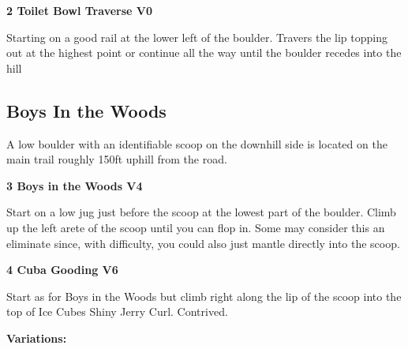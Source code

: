 \begin{multicols}{2}
			
			
			\needspace{1.5cm}
\label{rt:Toilet Bowl Traverse}
\colorbox{green!20}{
\parbox{0.95\linewidth}{
\textbf{
2 Toilet Bowl Traverse V0  
}}}

			\begin{adjustwidth}{0.5cm}{}			
			Starting on a good rail at the lower left of the boulder. Travers the lip topping out at the highest point or continue all the way until the boulder recedes into the hill
			\end{adjustwidth}
			
			
		


		\needspace{1.5cm}
		\subsection*{Boys In the Woods}\label{bf:Boys In the Woods}
		A low boulder with an identifiable scoop on the downhill side is located on the main trail roughly 150ft uphill from the road.\\
	
		
			
			\needspace{1.5cm}
\label{rt:Boys in the Woods}
\colorbox{RoyalBlue!20}{
\parbox{0.95\linewidth}{
\textbf{
3 Boys in the Woods V4  
}}}

			\begin{adjustwidth}{0.5cm}{}			
			Start on a low jug just before the scoop at the lowest part of the boulder. Climb up the left arete of the scoop until you can flop in. Some may consider this an eliminate since, with difficulty, you could also just mantle directly into the scoop.
			\end{adjustwidth}
			
			
			
			\needspace{1.5cm}
\label{rt:Cuba Gooding}
\colorbox{RoyalBlue!20}{
\parbox{0.95\linewidth}{
\textbf{
4 Cuba Gooding V6  
}}}

			\begin{adjustwidth}{0.5cm}{}			
			Start as for Boys in the Woods but climb right along the lip of the scoop into the top of Ice Cubes Shiny Jerry Curl. Contrived.
			\end{adjustwidth}
			
				\begin{adjustwidth}{0.5cm}{}				
				\needspace{3cm}
				\textbf{Variations:} \newline
					

\end{adjustwidth}
\end{multicols}
